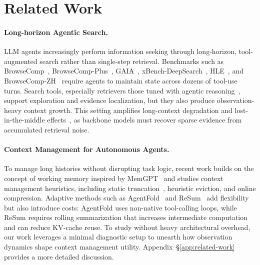 \section{Related Work}
\paragraph{Long-horizon Agentic Search.}
LLM agents increasingly perform information seeking through long-horizon, tool-augmented search rather than single-step retrieval.
Benchmarks such as BrowseComp~\citep{wei2025browsecomp}, BrowseComp-Plus~\citep{chen2025browsecompplus}, GAIA~\citep{mialon2024gaia}, xBench-DeepSearch~\citep{chen2025xbench}, HLE~\citep{phan2025hle}, and BrowseComp-ZH~\citep{zhou2025browsecompzh} require agents to maintain state across dozens of tool-use turns. Search tools, especially retrievers those tuned with agentic reasoning~\citep{chen2026agentir,tang2026largereasonembedding}, support exploration and evidence localization, but they also produce observation-heavy context growth. This setting amplifies long-context degradation and lost-in-the-middle effects~\citep{liu2024lost}, as backbone models must recover sparse evidence from accumulated retrieval noise.  

\paragraph{Context Management for Autonomous Agents.} 
To manage long histories without disrupting task logic, recent work builds on the concept of working memory inspired by MemGPT~\citep{packer2023memgpt} and studies context management heuristics, including static truncation~\citep{liu2025deepseekv32,zeng2026glm5,moonshot2025kimi_researcher}, heuristic eviction, and online compression. Adaptive methods such as AgentFold~\citep{ye2025agentfold} and ReSum~\citep{wu2025resum} add flexibility but also introduce costs: AgentFold uses non-native tool-calling loops, while ReSum requires rolling summarization that increases intermediate computation and can reduce KV-cache reuse. To study without heavy architectural overhead, our work leverages a minimal diagnostic setup to unearth how observation dynamics shape context management utility. Appendix~\S\ref{app:related-work} provides a more detailed discussion.